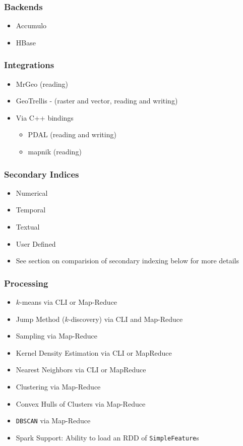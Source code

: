 \subsubsection*{Backends}

\begin{itemize}
\item Accumulo
\item HBase
\end{itemize}

\subsubsection*{Integrations}

\begin{itemize}
\item MrGeo (reading)
\item GeoTrellis - (raster and vector, reading and writing)
\item{
  Via C++ bindings
  \begin{itemize}
  \item PDAL (reading and writing)
  \item mapnik (reading)
  \end{itemize}
}
\end{itemize}


\subsubsection*{Secondary Indices}

\begin{itemize}
\item Numerical
\item Temporal
\item Textual
\item User Defined
\item See section on comparision of secondary indexing below for more details
\end{itemize}

\subsubsection*{Processing}

\begin{itemize}
\item $k$-means via CLI or Map-Reduce
\item Jump Method ($k$-discovery) via CLI and Map-Reduce
\item Sampling via Map-Reduce
\item Kernel Density Estimation via CLI or MapReduce
\item Nearest Neighbors via CLI or MapReduce
\item Clustering via Map-Reduce
\item Convex Hulls of Clusters via Map-Reduce
\item \texttt{DBSCAN} via Map-Reduce
\item Spark Support: Ability to load an RDD of \texttt{SimpleFeature}s
\end{itemize}

